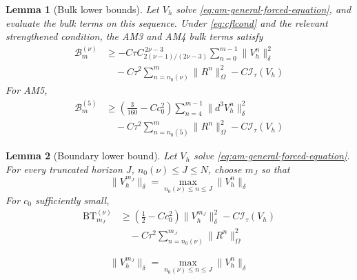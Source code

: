 \documentclass[10pt,a4paper]{amsart}
\newtheorem{lem}{Lemma}
\begin{document}
\begin{lem}[Bulk lower bounds]
\label{lem:adams-bulk-lower-bounds}
Let \(V_h\) solve \eqref{eq:am-general-forced-equation}, and evaluate the
bulk terms on this sequence. Under \eqref{eq:cflcond} and the relevant
strengthened condition, the AM3 and AM4 bulk terms satisfy
\begin{align}
\mathcal B_m^{(\nu)}
&\ge-C\tau C_{2(\nu-1)/(2\nu-3)}^{\,2\nu-3}
\sum_{n=0}^{m-1}\|V_h^n\|_{\delta}^2 \label{eq:am34-bulk-lower-bound-solution}\\
&\quad-C\tau^2\sum_{n=n_0(\nu)}^{m}\|R^n\|_{\Omega}^2
-C\mathcal I_{\tau}(V_h) \label{eq:am34-bulk-lower-bound-forcing}
\end{align}
For AM5,
\begin{align}
\mathcal B_m^{(5)}
&\ge\left(\frac3{160}-Cc_0^2\right)
\sum_{n=4}^{m-1}\|d^3V_h^n\|_{\delta}^2 \label{eq:am5-bulk-lower-bound-solution}\\
&\quad-C\tau^2\sum_{n=n_0(5)}^{m}\|R^n\|_{\Omega}^2
-C\mathcal I_{\tau}(V_h) \label{eq:am5-bulk-lower-bound-forcing}
\end{align}
\end{lem}

\begin{lem}[Boundary lower bound]
\label{lem:adams-boundary-lower-bound}
Let \(V_h\) solve \eqref{eq:am-general-forced-equation}. For every truncated
horizon \(J\), \(n_0(\nu)\le J\le N\), choose \(m_J\) so that
\begin{equation}
\|V_h^{m_J}\|_{\delta}
=\max_{n_0(\nu)\le n\le J}\|V_h^n\|_{\delta} \label{eq:adams-maximum-energy-index}
\end{equation}
For \(c_0\) sufficiently small,
\begin{align}
\mathrm{BT}_{m_J}^{(\nu)}
&\ge\left(\frac12-Cc_0^2\right)
\|V_h^{m_J}\|_{\delta}^2
-C\mathcal I_{\tau}(V_h) \label{eq:adams-boundary-lower-bound-solution}\\
&\quad-C\tau^2\sum_{n=n_0(\nu)}^{m_J}\|R^n\|_{\Omega}^2
\label{eq:adams-boundary-lower-bound-forcing}
\end{align}
\end{lem}

\begin{equation}
\|V_h^{m_J}\|_{\delta}
=\max_{n_0(\nu)\le n\le J}\|V_h^n\|_{\delta} 
\end{equation}
\end{document}
